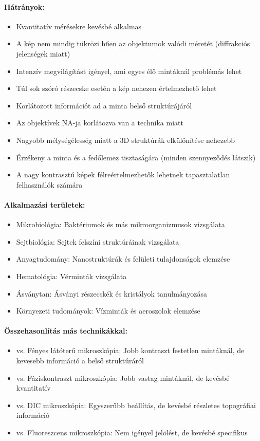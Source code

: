 \documentclass[a4paper,12pt]{article}
\begin{document}
\paragraph{Hátrányok:} \begin{itemize} \item Kvantitatív mérésekre kevésbé alkalmas \item A kép nem mindig tükrözi hűen az objektumok valódi méretét (diffrakciós jelenségek miatt) \item Intenzív megvilágítást igényel, ami egyes élő mintáknál problémás lehet \item Túl sok szóró részecske esetén a kép nehezen értelmezhető lehet \item Korlátozott információt ad a minta belső struktúrájáról \item Az objektívek NA-ja korlátozva van a technika miatt \item Nagyobb mélységélesség miatt a 3D struktúrák elkülönítése nehezebb \item Érzékeny a minta és a fedőlemez tisztaságára (minden szennyeződés látszik) \item A nagy kontrasztú képek félreértelmezhetők lehetnek tapasztalatlan felhasználók számára \end{itemize}

\paragraph{Alkalmazási területek:} \begin{itemize} \item Mikrobiológia: Baktériumok és más mikroorganizmusok vizsgálata \item Sejtbiológia: Sejtek felszíni struktúráinak vizsgálata \item Anyagtudomány: Nanostruktúrák és felületi tulajdonságok elemzése \item Hematológia: Vérminták vizsgálata \item Ásványtan: Ásványi részecskék és kristályok tanulmányozása \item Környezeti tudományok: Vízminták és aeroszolok elemzése \end{itemize}

\paragraph{Összehasonlítás más technikákkal:} \begin{itemize} \item vs. Fényes látóterű mikroszkópia: Jobb kontraszt festetlen mintáknál, de kevesebb információ a belső struktúráról \item vs. Fáziskontraszt mikroszkópia: Jobb vastag mintáknál, de kevésbé kvantitatív \item vs. DIC mikroszkópia: Egyszerűbb beállítás, de kevésbé részletes topográfiai információ \item vs. Fluoreszcens mikroszkópia: Nem igényel jelölést, de kevésbé specifikus \end{itemize}
\end{document}

